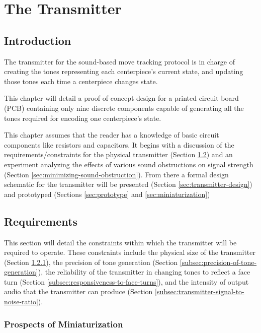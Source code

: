 
\chapter{The Transmitter} %
\label{Chapter6} 


\section{Introduction}

The transmitter for the sound-based move tracking protocol is in charge
of creating the tones representing each centerpiece's current state,
and updating those tones each time a centerpiece changes state.

This chapter will detail a proof-of-concept design for a printed
circuit board (PCB) containing only nine discrete components capable of
generating all the tones required for encoding one centerpiece's state.

This chapter assumes that the reader has a knowledge of basic circuit
components like resistors and capacitors. It begins with a
discussion of the requirements/constraints for the physical transmitter
(Section \ref{sec:transmitter-requirements}) and an experiment
analyzing the effects of various sound obstructions on signal strength
(Section \ref{sec:minimizing-sound-obstruction}). From there a formal
design schematic for the transmitter will be presented (Section
\ref{sec:transmitter-design}) and prototyped (Sections
\ref{sec:prototype} and \ref{sec:miniaturization})


\section{Requirements}
\label{sec:transmitter-requirements}

This section will detail the constraints within which the transmitter
will be required to operate. These constraints include the physical
size of the transmitter (Section
\ref{subsec:prospects-of-miniaturization}), the precision of tone
generation (Section \ref{subsec:precision-of-tone-generation}), the
reliability of the transmitter in changing tones to reflect a face turn
(Section \ref{subsec:responsiveness-to-face-turns}), and the intensity
of output audio that the transmitter can produce (Section
\ref{subsec:transmitter-signal-to-noise-ratio}).

\subsection{Prospects of Miniaturization}
\label{subsec:prospects-of-miniaturization}

